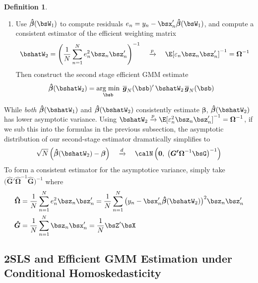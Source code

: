 \documentclass[12pt]{article}
\theoremstyle{plain}
\theoremstyle{definition}
\newtheorem{defn}[thm]{Definition}
\theoremstyle{remark}
\newcommand{\bsbeta}{\boldsymbol{\beta}}
\newcommand{\bshatG}{\boldsymbol{\hat{G}}}
\newcommand{\bsOmega}{\boldsymbol{\Omega}}
\newcommand{\bshatbeta}{\boldsymbol{\hat{\beta}}}
\newcommand{\bshatOmega}{\boldsymbol{\hat{\Omega}}}
\newcommand{\bsbarg}{\boldsymbol{\overline{g}}}
\renewcommand{\bso}{\boldsymbol{0}}
\newcommand{\bsGp}{\boldsymbol{G'}}
\DeclareMathOperator*{\argmin}{arg\;min}
\newcommand{\pto}{\xrightarrow{p}}
\newcommand{\dto}{\xrightarrow{d}}
\newcommand{\sumnN}{\sum^N_{n=1}}
\begin{document}
\begin{defn}
\begin{enumerate}[label=(\roman*)]
  \item Use $\bshatbeta(\bsW_1)$ to compute residuals
    $e_n = y_n - \bsx_n'\bshatbeta(\bsW_1)$, and compute a consistent
    estimator of the efficient weighting matrix
    \begin{align*}
      \bshatW_2 = \left(\frac{1}{N}\sumnN e_n^2\bsz_n\bsz_n'\right)^{-1}
      \quad\pto\quad \E[\varepsilon_n\bsz_n\bsz_n']^{-1}
      = \bsOmega^{-1}
    \end{align*}
    Then construct the second stage efficient GMM estimate
    \begin{alignat*}{3}
      \bshatbeta(\bshatW_2) &=
      \argmin_{\bsb}\;
      \bsbarg_N(\bsb)' \, \bshatW_2 \, \bsbarg_N(\bsb)
    \end{alignat*}
\end{enumerate}
While \emph{both} $\bshatbeta(\bshatW_1)$ and $\bshatbeta(\bshatW_2)$
consistently estimate $\bsbeta$, $\bshatbeta(\bshatW_2)$ has lower
asymptotic variance.
Using $\bshatW_2\pto \E[\varepsilon_n^2\bsz_n\bsz_n']^{-1}=\bsOmega^{-1}$,
if we sub this into the formulas in the previous subsection, the
asymptotic distribution of our second-stage estimator dramatically
simplifies to
\begin{align*}
  \sqrt{N}\left(\bshatbeta(\bshatW_2) - \bsbeta\right)
  \quad \dto \quad
  \calN\left(
    \bso,\;
    \big(
    \bsGp
    \bsOmega^{-1}
    \bsG
    \big)^{-1}
  \right)
\end{align*}
To form a consistent estimator for the asymptotice variance, simply
take $\big(\bshatG'\bshatOmega^{-1}\bshatG\big)^{-1}$ where
\begin{align*}
  \bshatOmega &=
  \frac{1}{N}\sumnN e_n^2\bsz_n\bsz_n'
  =
  \frac{1}{N}\sumnN \big(y_n-\bsx_n'\bshatbeta(\bshatW_2)\big)^2\bsz_n\bsz_n'
  \\
  \bshatG
  &=
  \frac{1}{N}\sumnN
  \bsz_n\bsx_n'
  = \frac{1}{N}\bsZ'\bsX
\end{align*}
\end{defn}

\clearpage
\subsection{2SLS and Efficient GMM Estimation under Conditional Homoskedasticity}
\end{document}
